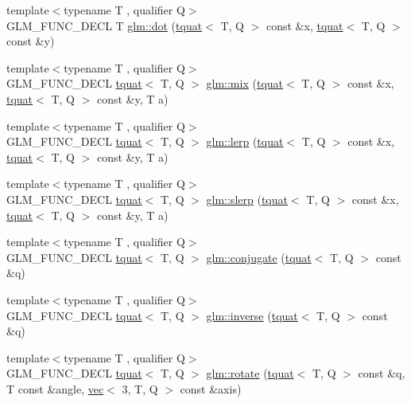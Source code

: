 \begin{DoxyCompactItemize}
\item 
{\footnotesize template$<$typename T , qualifier Q$>$ }\\G\+L\+M\+\_\+\+F\+U\+N\+C\+\_\+\+D\+E\+CL T \hyperlink{group__gtc__quaternion_gab219911644fdc694e7d275cfcf35bfca}{glm\+::dot} (\hyperlink{structglm_1_1tquat}{tquat}$<$ T, Q $>$ const \&x, \hyperlink{structglm_1_1tquat}{tquat}$<$ T, Q $>$ const \&y)
\item 
{\footnotesize template$<$typename T , qualifier Q$>$ }\\G\+L\+M\+\_\+\+F\+U\+N\+C\+\_\+\+D\+E\+CL \hyperlink{structglm_1_1tquat}{tquat}$<$ T, Q $>$ \hyperlink{group__gtc__quaternion_ga6c31ccbb8548b2b24226901e602dfc0a}{glm\+::mix} (\hyperlink{structglm_1_1tquat}{tquat}$<$ T, Q $>$ const \&x, \hyperlink{structglm_1_1tquat}{tquat}$<$ T, Q $>$ const \&y, T a)
\item 
{\footnotesize template$<$typename T , qualifier Q$>$ }\\G\+L\+M\+\_\+\+F\+U\+N\+C\+\_\+\+D\+E\+CL \hyperlink{structglm_1_1tquat}{tquat}$<$ T, Q $>$ \hyperlink{group__gtc__quaternion_gabc58e7013ef63d6df69c28c14afd0c01}{glm\+::lerp} (\hyperlink{structglm_1_1tquat}{tquat}$<$ T, Q $>$ const \&x, \hyperlink{structglm_1_1tquat}{tquat}$<$ T, Q $>$ const \&y, T a)
\item 
{\footnotesize template$<$typename T , qualifier Q$>$ }\\G\+L\+M\+\_\+\+F\+U\+N\+C\+\_\+\+D\+E\+CL \hyperlink{structglm_1_1tquat}{tquat}$<$ T, Q $>$ \hyperlink{group__gtc__quaternion_ga3796542dac06014d541d67ebd5f2a88a}{glm\+::slerp} (\hyperlink{structglm_1_1tquat}{tquat}$<$ T, Q $>$ const \&x, \hyperlink{structglm_1_1tquat}{tquat}$<$ T, Q $>$ const \&y, T a)
\item 
{\footnotesize template$<$typename T , qualifier Q$>$ }\\G\+L\+M\+\_\+\+F\+U\+N\+C\+\_\+\+D\+E\+CL \hyperlink{structglm_1_1tquat}{tquat}$<$ T, Q $>$ \hyperlink{group__gtc__quaternion_gac40833db608deda477f018767b9a1cad}{glm\+::conjugate} (\hyperlink{structglm_1_1tquat}{tquat}$<$ T, Q $>$ const \&q)
\item 
{\footnotesize template$<$typename T , qualifier Q$>$ }\\G\+L\+M\+\_\+\+F\+U\+N\+C\+\_\+\+D\+E\+CL \hyperlink{structglm_1_1tquat}{tquat}$<$ T, Q $>$ \hyperlink{group__gtc__quaternion_gadc59b59ce71daa5586a64a6acf36c072}{glm\+::inverse} (\hyperlink{structglm_1_1tquat}{tquat}$<$ T, Q $>$ const \&q)
\item 
{\footnotesize template$<$typename T , qualifier Q$>$ }\\G\+L\+M\+\_\+\+F\+U\+N\+C\+\_\+\+D\+E\+CL \hyperlink{structglm_1_1tquat}{tquat}$<$ T, Q $>$ \hyperlink{group__gtc__quaternion_ga21c6e3b6104c9b8116a35ddf2ac4d358}{glm\+::rotate} (\hyperlink{structglm_1_1tquat}{tquat}$<$ T, Q $>$ const \&q, T const \&angle, \hyperlink{structglm_1_1vec}{vec}$<$ 3, T, Q $>$ const \&axis)

\end{DoxyCompactItemize}
